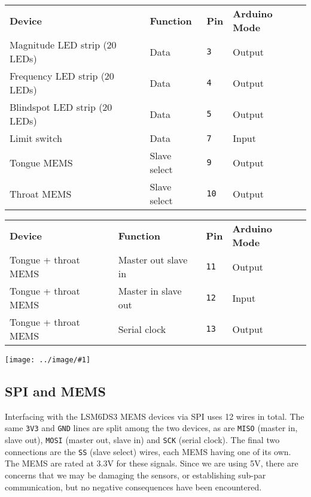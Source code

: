 \documentclass{article}
\newcommand{\img}[2]{
    \begin{center}
        \texttt{[image: ../image/\#1]}
    \end{center}    
}
\begin{document}
    \noindent\begin{tabular}{llll}
        \textbf{Device} & \textbf{Function} & \textbf{Pin} & \textbf{Arduino Mode} \\
        Magnitude LED strip (20 LEDs) & Data & \texttt{3} & Output \\
        Frequency LED strip (20 LEDs) & Data & \texttt{4} & Output \\
        Blindspot LED strip (20 LEDs) & Data & \texttt{5} & Output \\
        Limit switch\footnotemark\ & Data & \texttt{7} & Input \\
        Tongue MEMS & Slave select & \texttt{9} & Output \\
        Throat MEMS & Slave select & \texttt{10} & Output 
    \end{tabular}\vspace{2.9mm}
    
    
    \noindent\begin{tabular}{llll}\textbf{Device} & \textbf{Function} & \textbf{Pin} & \textbf{Arduino Mode} \\
        Tongue + throat MEMS & Master out slave in & \texttt{11} & Output \\
        Tongue + throat MEMS & Master in slave out & \texttt{12} & Input \\
        Tongue + throat MEMS & Serial clock & \texttt{13} & Output
    \end{tabular}\newline
    
    \img{close}{0.0845}
    
    \subsection{SPI and MEMS}
    Interfacing with the LSM6DS3 MEMS devices via SPI uses 12 wires in total. The same \texttt{3V3} and \texttt{GND} lines are split among the two devices, as are \texttt{MISO} (master in, slave out), \texttt{MOSI} (master out, slave in) and \texttt{SCK} (serial clock). The final two connections are the \texttt{SS} (slave select) wires, each MEMS having one of its own. The MEMS are rated at 3.3V for these signals. Since we are using 5V, there are concerns that we may be damaging the sensors, or establishing sub-par communication, but no negative consequences have been encountered.
    
\end{document}

